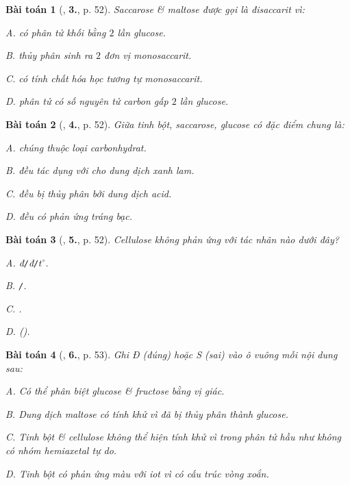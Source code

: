 \documentclass{article}
\numberwithin{equation}{section}
\newtheorem{baitoan}{Bài toán}[section]
\begin{document}
\begin{baitoan}[\cite{An2008}, \textbf{3.}, p. 52]
	Saccarose \& maltose được gọi là đisaccarit vì:
	\begin{enumerate*}
		\item[{\rm\sf A.}] có phân tử khối bằng $2$ lần glucose.
		\item[{\rm\sf B.}] thủy phân sinh ra $2$ đơn vị monosaccarit.
		\item[{\rm\sf C.}] có tính chất hóa học tương tự monosaccarit.
		\item[{\rm\sf D.}] phân tử có số nguyên tử carbon gấp $2$ lần glucose.
	\end{enumerate*}
\end{baitoan}

\begin{baitoan}[\cite{An2008}, \textbf{4.}, p. 52]
	Giữa tinh bột, saccarose, glucose có đặc điểm chung là:
	\begin{enumerate*}
		\item[{\rm\sf A.}] chúng thuộc loại carbonhydrat.
		\item[{\rm\sf B.}] đều tác dụng với \emph{} cho dung dịch xanh lam.
		\item[{\rm\sf C.}] đều bị thủy phân bởi dung dịch acid.
		\item[{\rm\sf D.}] đều có phản ứng tráng bạc.
	\end{enumerate*}
\end{baitoan}

\begin{baitoan}[\cite{An2008}, \textbf{5.}, p. 52]
	Cellulose không phản ứng với tác nhân nào dưới đây?
	 \begin{enumerate*}
	 	\item[{\rm\sf A.}] \emph{đ\texttt{/}đ\texttt{/}$t^\circ$}.
	 	\item[{\rm\sf B.}] \emph{\texttt{/}\ce{Ni}}.
	 	\item[{\rm\sf C.}] \emph{\ce{Cu(OH)2 + NH3}}.
	 	\item[{\rm\sf D.}] \emph{(\ce{CS2 + NaOH})}.
	 \end{enumerate*}
\end{baitoan}

\begin{baitoan}[\cite{An2008}, \textbf{6.}, p. 53]
	Ghi Đ (đúng) hoặc S (sai) vào ô vuông mỗi nội dung sau:
	\begin{enumerate*}
		\item[{\rm\sf A.}] Có thể phân biệt glucose \& fructose bằng vị giác.
		\item[{\rm\sf B.}] Dung dịch maltose có tính khử vì đã bị thủy phân thành glucose.
		\item[{\rm\sf C.}] Tinh bột \& cellulose không thể hiện tính khử vì trong phân tử hầu như không có nhóm \emph{} hemiaxetal tự do.
		\item[{\rm\sf D.}] Tinh bột có phản ứng màu với iot vì có cấu trúc vòng xoắn.
	\end{enumerate*}
\end{baitoan}
\end{document}
